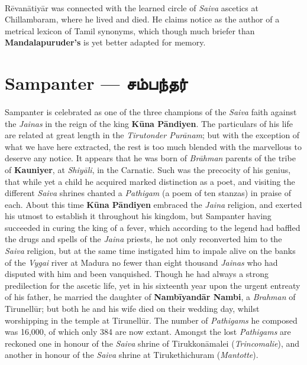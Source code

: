 \documentclass{article}
\newcommand{\TamilBold}[1]{\texttamil{\textbf{#1}}}
\newcommand{\tambold}[1]{\TamilBold{#1}}
\begin{document}
\paragraph{}
R\={e}van\={a}tiy\={a}r was connected with the learned circle of \emph{Saiva} ascetics at Chillambaram, where he lived and died. He claims notice as the author of a metrical lexicon of Tamil synonyms, which though much briefer than \textbf{Mandalapuruder's} is yet better adapted for memory.

\section{Sampanter --- \tambold{சம்பந்தர்}}
\paragraph{}
Sampanter is celebrated as one of the three champions of the \emph{Saiva} faith against the \emph{Jainas} in the reign of the king \textbf{K\={u}na P\={a}ndiyen}. The particulars of his life are related at great length in the \emph{Tirutonder Pur\={a}nam}; but with the exception of what we have here extracted, the rest is too much blended with the marvellous to deserve any notice. It appears that he was born of \emph{Br\={a}hman} parents of the tribe of \textbf{Kauniyer}, at \emph{Shiy\={a}li}, in the Carnatic. Such was the precocity of his genius, that while yet a child he acquired marked distinction as a poet, and visiting the different \emph{Saiva} shrines chanted a \emph{Pathigam} (a poem of ten stanzas) in praise of each. About this time \textbf{K\={u}na P\={a}ndiyen} embraced the \emph{Jaina} religion, and exerted his utmost to establish it throughout his kingdom, but Sampanter having succeeded in curing the king of a fever, which according to the legend had baffled the drugs and spells of the \emph{Jaina} priests, he not only reconverted him to the \emph{Saiva} religion, but at the same time instigated him to impale alive on the banks of the \emph{Vygai} river at Madura no fewer than eight thousand \emph{Jainas} who had disputed with him and been vanquished. Though he had always a strong predilection for the ascetic life, yet in his sixteenth year upon the urgent entreaty of his father, he married the daughter of \textbf{Namb\={i}yand\={a}r Nambi}, a \emph{Brahman} of Tirunell\={u}r; but both he and his wife died on their wedding day, whilst worshipping in the temple at Tirunell\={u}r. The number of \emph{Pathigams} he composed was 16,000, of which only 384 are now extant. Amongst the lost \emph{Pathigams} are reckoned one in honour of the \emph{Saiva} shrine of Tirukkon\={a}malei (\emph{Trincomalie}), and another in honour of the \emph{Saiva} shrine at Tirukethichuram (\emph{Mantotte}).
\end{document}
